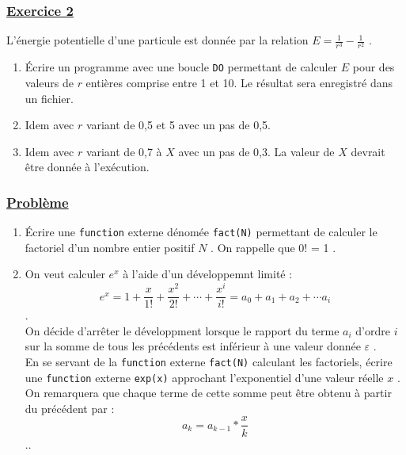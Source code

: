 \documentclass[a4paper, 11pt]{report}
\begin{document}
\subsubsection{\underline{Exercice 2}}

\noindent
L'énergie potentielle d'une particule est donnée par la relation $ E = \frac{1}{r^3} - \frac{1}{r^2} $ .

\begin{enumerate}
  \item[(a)] Écrire un programme avec une boucle \verb|DO| permettant de calculer $E$ pour des valeurs de $r$ entières comprise entre 1 et 10. Le résultat sera enregistré dans un fichier.
  \item[(b)] Idem avec $r$ variant de 0,5 et 5 avec un pas de 0,5.
  \item[(c)] Idem avec $r$ variant de 0,7 à $X$ avec un pas de 0,3. La valeur de $X$ devrait être donnée à l'exécution.
\end{enumerate}

\subsubsection{\underline{Problème}}

\begin{enumerate}
  \item Écrire une \verb|function| externe dénomée \verb|fact(N)| permettant de calculer le factoriel d'un nombre entier positif $N$ . On rappelle que 0! = 1 .
  \item On veut calculer $e^x$ à l'aide d'un développemnt limité : 
    $$ e^x = 1 + \frac{x}{1!} + \frac{x^2}{2!} + \cdots + \frac{x^i}{i!} = a_0 + a_1 + a_2 + \cdots a_i $$ . \\
    On décide d'arrêter le développment lorsque le rapport du terme $a_i$ d'ordre $i$ sur la somme de tous les précédents est inférieur à une valeur donnée $\varepsilon $ . \\ 
    
    \vspace{0,125 cm}
    \noindent
    En se servant de la \verb|function| externe \verb|fact(N)| calculant les factoriels, écrire une \verb|function| externe \verb|exp(x)| approchant l'exponentiel d'une valeur réelle $x$ . \\
    On remarquera que chaque terme de cette somme peut être obtenu à partir du précédent par :
    $$ a_k = a_{k - 1} * \frac{x}{k} $$ ..
\end{enumerate}
\end{document}
